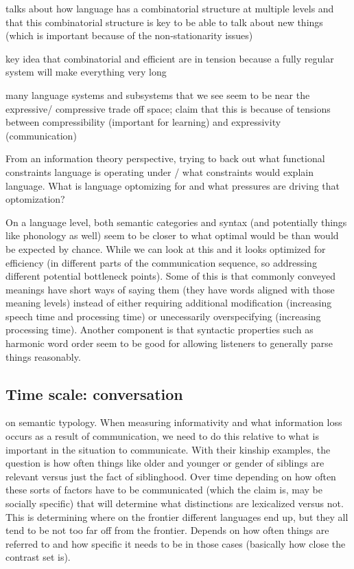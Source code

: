 \documentclass[]{article}
\begin{document}
\cite{kirby2015} talks about how language has a combinatorial structure at multiple levels and that this combinatorial structure is key to be able to talk about new things (which is important because of the non-stationarity issues) 

\cite{kirby2015} key idea that combinatorial and efficient are in tension because a fully regular system will make everything very long

\cite{kirby2015} many language systems and subsystems that we see seem to be near the expressive/ compressive trade off space; claim that this is because of tensions between compressibility (important for learning) and expressivity (communication) 

\cite{futrell2022} From an information theory perspective, trying to back out what functional constraints language is operating under / what constraints would explain language. What is language optomizing for and what pressures are driving that optomization? 

On a language level, both semantic categories and syntax (and potentially things like phonology as well) seem to be closer to what optimal would be than would be expected by chance. While we can look at this and it looks optimized for efficiency (in different parts of the communication sequence, so addressing different potential bottleneck points). Some of this is that commonly conveyed meanings have short ways of saying them (they have words aligned with those meaning levels) instead of either requiring additional modification (increasing speech time and processing time) or unecessarily overspecifying (increasing processing time). Another component is that syntactic properties such as harmonic word order seem to be good for allowing listeners to generally parse things reasonably. 


\subsection{Time scale: conversation} 

\cite{kemp2018} on semantic typology. When measuring informativity and what information loss occurs as a result of communication, we need to do this relative to what is important in the situation to communicate. With their kinship examples, the question is how often things like older and younger or gender of siblings are relevant versus just the fact of siblinghood. Over time depending on how often these sorts of factors have to be communicated (which the claim is, may be socially specific) that will determine what distinctions are lexicalized versus not. This is determining where on the frontier different languages end up, but they all tend to be not too far off from the frontier. Depends on how often things are referred to and how specific it needs to be in those cases (basically how close the contrast set is). 
\end{document}
